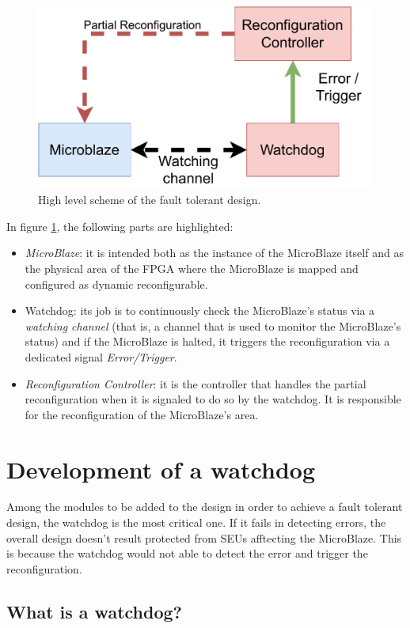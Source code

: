 \begin{figure}[H]
\centering
\includegraphics[width=0.8\linewidth]{images/chapter4/reconf_scheme.pdf}
\caption{High level scheme of the fault tolerant design.}
\label{fig:reconf_scheme}
\end{figure}

In figure \ref{fig:reconf_scheme}, the following parts are highlighted:
\begin{itemize}
    \item \textit{MicroBlaze}: it is intended both as the instance of the MicroBlaze itself and as the physical area of the FPGA where the MicroBlaze is mapped and configured as dynamic reconfigurable.
    \item Watchdog: its job is to continuously check the MicroBlaze's status via a \textit{watching channel} (that is, a channel that is used to monitor the MicroBlaze's status) and if the MicroBlaze is halted, it triggers the reconfiguration via a dedicated signal \textit{Error/Trigger}.
    \item \textit{Reconfiguration Controller}: it is the controller that handles the partial reconfiguration when it is signaled to do so by the watchdog. It is responsible for the reconfiguration of the MicroBlaze's area.
\end{itemize}

\section{Development of a watchdog}

Among the modules to be added to the design in order to achieve a fault tolerant design, the watchdog is the most critical one. If it fails in detecting errors, the overall design doesn't result protected from SEUs afftecting the MicroBlaze. This is because the watchdog would not able to detect the error and trigger the reconfiguration. 

\subsection{What is a watchdog?}


